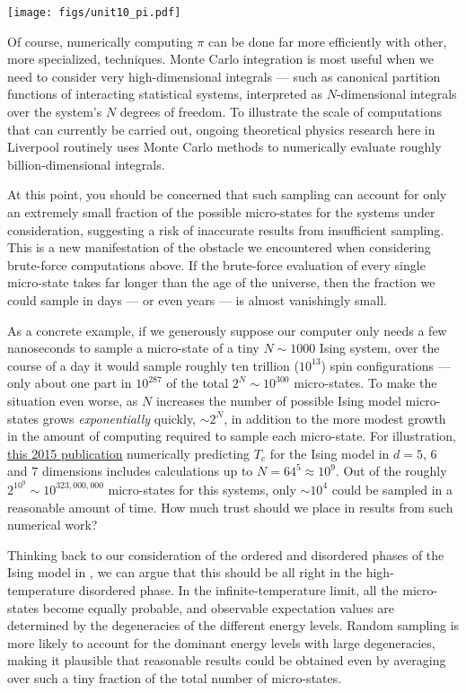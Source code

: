 \begin{center}\texttt{[image: figs/unit10\_pi.pdf]}\end{center}

Of course, numerically computing $\pi$ can be done far more efficiently with other, more specialized, techniques.
Monte Carlo integration is most useful when we need to consider very high-dimensional integrals --- such as canonical partition functions of interacting statistical systems, interpreted as $N$-dimensional integrals over the system's $N$ degrees of freedom.
To illustrate the scale of computations that can currently be carried out, ongoing theoretical physics research here in Liverpool routinely uses Monte Carlo methods to numerically evaluate roughly billion-dimensional integrals.

At this point, you should be concerned that such sampling can account for only an extremely small fraction of the possible micro-states for the systems under consideration, suggesting a risk of inaccurate results from insufficient sampling.
This is a new manifestation of the obstacle we encountered when considering brute-force computations above.
If the brute-force evaluation of every single micro-state takes far longer than the age of the universe, then the fraction we could sample in days --- or even years --- is almost vanishingly small.

As a concrete example, if we generously suppose our computer only needs a few nanoseconds to sample a micro-state of a tiny $N \sim 1000$ Ising system, over the course of a day it would sample roughly ten trillion ($10^{13}$) spin configurations --- only about one part in $10^{287}$ of the total $2^N \sim 10^{300}$ micro-states.
To make the situation even worse, as $N$ increases the number of possible Ising model micro-states grows \textit{exponentially} quickly, $\sim$$2^N$, in addition to the more modest growth in the amount of computing required to sample each micro-state.
For illustration, \href{https://arxiv.org/abs/1502.07613}{this 2015 publication} numerically predicting $T_c$ for the Ising model in $d = 5$, $6$ and $7$ dimensions includes calculations up to $N = 64^5 \approx 10^9$.
Out of the roughly $2^{10^9} \sim 10^{323{,}000{,}000}$ micro-states for this systems, only $\sim$$10^4$ could be sampled in a reasonable amount of time.
How much trust should we place in results from such numerical work?

Thinking back to our consideration of the ordered and disordered phases of the Ising model in , we can argue that this should be all right in the high-temperature disordered phase.
In the infinite-temperature limit, all the micro-states become equally probable, and observable expectation values are determined by the degeneracies of the different energy levels.
Random sampling is more likely to account for the dominant energy levels with large degeneracies, making it plausible that reasonable results could be obtained even by averaging over such a tiny fraction of the total number of micro-states.

